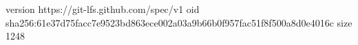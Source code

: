 version https://git-lfs.github.com/spec/v1
oid sha256:61e37d75facc7e9523bd863ece002a03a9b66b0f957fac51f8f500a8d0e4016c
size 1248
